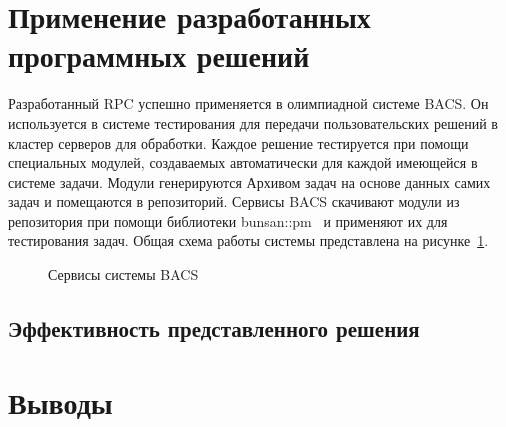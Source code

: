 
\section{Применение разработанных программных решений}
Разработанный RPC успешно применяется в олимпиадной системе BACS.
Он используется в системе тестирования для передачи пользовательских
решений в кластер серверов для обработки. Каждое решение тестируется
при помощи специальных модулей, создаваемых автоматически
для каждой имеющейся в системе задачи. Модули генерируются Архивом задач
на основе данных самих задач и помещаются в репозиторий. Сервисы BACS
скачивают модули из репозитория при помощи библиотеки bunsan::pm~\cite{bunsanpm}
и применяют их для тестирования задач. Общая схема работы системы
представлена на рисунке~\ref{fig:bacsservice}.

\begin{figure}[H]
    \centering
    
    \caption{Сервисы системы BACS}
    \label{fig:bacsservice}
\end{figure}

\subsection{Эффективность представленного решения}

\section{Выводы}

